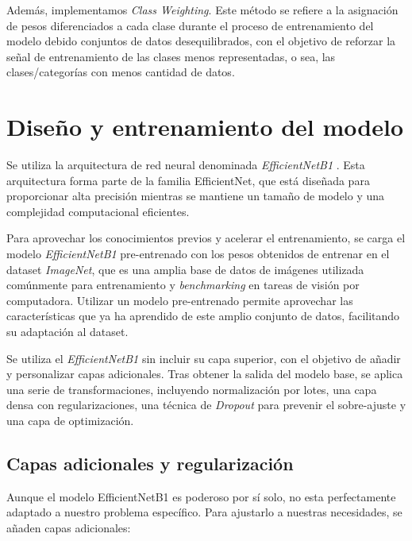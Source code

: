 Además, implementamos \textit{Class Weighting}. Este método se refiere a la asignación de pesos diferenciados a cada clase durante el proceso de entrenamiento del modelo debido conjuntos de datos desequilibrados, con el objetivo de reforzar la señal de entrenamiento de las clases menos representadas, o sea, las clases/categorías con menos cantidad de datos.

\section{Diseño y entrenamiento del modelo}

Se utiliza la arquitectura de red neural denominada \textit{EfficientNetB1} \cite{efficientnet} . Esta arquitectura forma parte de la familia EfficientNet, 
que está diseñada para proporcionar alta precisión mientras se mantiene un tamaño de modelo y una complejidad computacional eficientes.

Para aprovechar los conocimientos previos y acelerar el entrenamiento, se carga el modelo \textit{EfficientNetB1} pre-entrenado con los pesos obtenidos de entrenar en el dataset \textit{ImageNet}, que es una amplia base de datos de imágenes utilizada comúnmente para entrenamiento y \textit{benchmarking} en tareas de visión por computadora. Utilizar un modelo pre-entrenado permite aprovechar las características que ya ha aprendido de este amplio conjunto de datos, facilitando su adaptación al dataset.

Se utiliza el \textit{EfficientNetB1} sin incluir su capa superior, con el objetivo de añadir y personalizar capas adicionales. Tras obtener la salida del modelo base, se aplica una serie de transformaciones, incluyendo normalización por lotes, una capa densa con regularizaciones, una técnica de \textit{Dropout} para prevenir el sobre-ajuste y una capa de optimización. 

\subsection{Capas adicionales y regularización}

Aunque el modelo EfficientNetB1 es poderoso por sí solo, no esta perfectamente adaptado a nuestro problema específico. Para ajustarlo a nuestras necesidades, se añaden capas adicionales:

